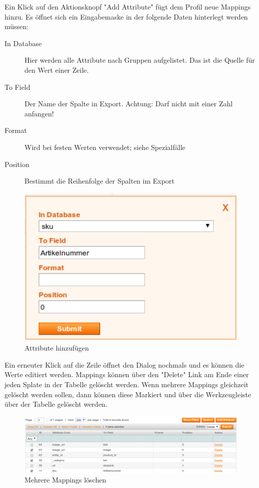 \documentclass[a4paper,12pt]{book}
\begin{document}
Ein Klick auf den Aktionsknopf "Add Attribute" fügt dem Profil neue 
Mappings hinzu. Es öffnet sich ein Eingabemaske in der folgende Daten 
hinterlegt werden müssen:

\begin{description}

\item[In Database] Hier werden alle Attribute nach Gruppen aufgelistet.
Das ist die Quelle für den Wert einer Zeile.

\item[To Field] Der Name der Spalte in Export. Achtung: Darf nicht mit
einer Zahl anfangen!

\item[Format] Wird bei festen Werten verwendet; siehe Spezialfälle

\item[Position] Bestimmt die Reihenfolge der Spalten im Export
\end{description}

\begin{figure}
 \includegraphics[width=1\textwidth]{img/bild06.png}
  \caption{Attribute hinzufügen}
  \label{figure:add_attribute}
\end{figure}

Ein erneuter Klick auf die Zeile öffnet den Dialog nochmals und es
können die Werte editiert werden. Mappings können über den "Delete"
Link am Ende einer jeden Splate in der Tabelle gelöscht werden. Wenn
mehrere Mappings gleichzeit gelöscht werden sollen, dann können diese
Markiert und über die Werkzeugleiste über der Tabelle gelöscht werden.

\begin{figure}
 \includegraphics[width=1\textwidth]{img/bild07.png}
  \caption{Mehrere Mappings löschen}
  \label{figure:delete_massactions}
\end{figure}
\end{document}
